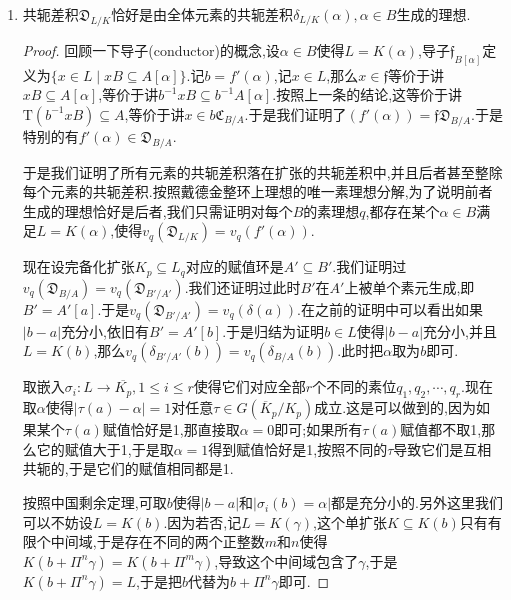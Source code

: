\begin{enumerate}
\begin{proof}
    	于是按照对偶基可得$\mathfrak{C}_{B/A}=\frac{1}{f'(\alpha)}\left(Ab_0+Ab_1+\cdots+Ab_{n-1}\right)$.再考虑$b_i$和$a_j$的关系式:$b_{n-1}=1$,$b_{n-2}-\alpha b_{n-1}=a_{n-1}$等,得到$Ab_0+Ab_1+\cdots+Ab_{n-1}=A[\alpha]=B$.于是$\mathfrak{C}_{B/A}=f'(\alpha)^{-1}B$,于是$\mathfrak{D}_{B/A}=(f'(\alpha))$.
    \end{proof}
    \item 共轭差积$\mathfrak{D}_{L/K}$恰好是由全体元素的共轭差积$\delta_{L/K}(\alpha),\alpha\in B$生成的理想.
    \begin{proof}
    	
    	回顾一下导子(conductor)的概念,设$\alpha\in B$使得$L=K(\alpha)$,导子$\mathfrak{f}_{B[\alpha]}$定义为$\{x\in L\mid xB\subseteq A[\alpha]\}$.记$b=f'(\alpha)$,记$x\in L$,那么$x\in\mathfrak{f}$等价于讲$xB\subseteq A[\alpha]$,等价于讲$b^{-1}xB\subseteq b^{-1}A[\alpha]$.按照上一条的结论,这等价于讲$\mathrm{T}(b^{-1}xB)\subseteq A$,等价于讲$x\in b\mathfrak{C}_{B/A}$.于是我们证明了$(f'(\alpha))=\mathfrak{f}\mathfrak{D}_{B/A}$.于是特别的有$f'(\alpha)\in\mathfrak{D}_{B/A}$.
    	
    	于是我们证明了所有元素的共轭差积落在扩张的共轭差积中,并且后者甚至整除每个元素的共轭差积.按照戴德金整环上理想的唯一素理想分解,为了说明前者生成的理想恰好是后者,我们只需证明对每个$B$的素理想$q$,都存在某个$\alpha\in B$满足$L=K(\alpha)$,使得$v_q(\mathfrak{D}_{L/K})=v_q(f'(\alpha))$.
    	
    	现在设完备化扩张$K_p\subseteq L_q$对应的赋值环是$A'\subseteq B'$.我们证明过$v_q(\mathfrak{D}_{B/A})=v_q(\mathfrak{D}_{B'/A'})$.我们还证明过此时$B'$在$A'$上被单个素元生成,即$B'=A'[a]$.于是$v_q(\mathfrak{D}_{B'/A'})=v_q(\delta(a))$.在之前的证明中可以看出如果$|b-a|$充分小,依旧有$B'=A'[b]$.于是归结为证明$b\in L$使得$|b-a|$充分小,并且$L=K(b)$,那么$v_q(\delta_{B'/A'}(b))=v_q(\delta_{B/A}(b))$.此时把$\alpha$取为$b$即可.
    	
    	取嵌入$\sigma_i:L\to\overline{K_p},1\le i\le r$使得它们对应全部$r$个不同的素位$q_1,q_2,\cdots,q_r$.现在取$\alpha$使得$|\tau(a)-\alpha|=1$对任意$\tau\in G(\overline{K}_p/K_p)$成立.这是可以做到的,因为如果某个$\tau(a)$赋值恰好是1,那直接取$\alpha=0$即可;如果所有$\tau(a)$赋值都不取1,那么它的赋值大于1,于是取$\alpha=1$得到赋值恰好是1,按照不同的$\tau$导致它们是互相共轭的,于是它们的赋值相同都是1.
    	
    	按照中国剩余定理,可取$b$使得$|b-a|$和$|\sigma_i(b)=\alpha|$都是充分小的.另外这里我们可以不妨设$L=K(b)$.因为若否,记$L=K(\gamma)$,这个单扩张$K\subseteq K(b)$只有有限个中间域,于是存在不同的两个正整数$m$和$n$使得$K(b+\Pi^n\gamma)=K(b+\Pi^m\gamma)$,导致这个中间域包含了$\gamma$,于是$K(b+\Pi^n\gamma)=L$,于是把$b$代替为$b+\Pi^n\gamma$即可.
    	

\end{proof}
\end{enumerate}
